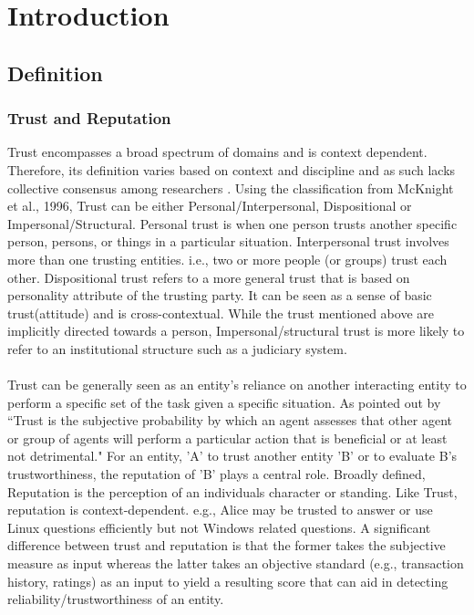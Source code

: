 \chapter{Introduction} \label{ch:intro}

\section{Definition}
\subsection{Trust and Reputation}
Trust encompasses a broad spectrum of domains and is context dependent.
Therefore, its definition varies based on context and discipline and as such
lacks collective consensus among researchers \cite{mcknight1996meanings} 
\cite{mcknight2001trust}.
Using the classification from McKnight et al., 1996, Trust can be either
Personal/Interpersonal, Dispositional or Impersonal/Structural.
Personal trust is when one person trusts another specific person, persons, or
things in a particular situation. Interpersonal trust involves more than one
trusting entities. i.e., two or more people (or groups) trust each other.
Dispositional trust refers to a more general trust that is based on personality
attribute of the trusting party. It can be seen as a sense of basic
trust(attitude) and is cross-contextual. While the trust mentioned above are
implicitly directed towards a person, Impersonal/structural trust is more
likely to refer to an institutional structure such as a judiciary system.\\\\ 
Trust can be generally seen as an entity's reliance on another interacting
entity to perform a specific set of the task given a specific situation.  As
pointed out by \cite{gambetta2000can} ``Trust is the subjective probability by
which an agent assesses that other agent or group of agents will perform a
particular action that is beneficial or at least not detrimental."
For an entity, 'A' to trust another entity 'B' or to evaluate B's
trustworthiness, the reputation of 'B' plays a central role. Broadly defined,
Reputation is the perception of an individuals character or standing. Like
Trust, reputation is context-dependent. e.g., Alice may be trusted to 
answer or use Linux questions efficiently but not Windows related questions.
\cite{zacharia2000collaborative}
A significant difference between trust and
reputation is that the former takes the subjective measure as input whereas the
latter takes an objective standard (e.g., transaction history, ratings) as an
input to yield a resulting score that can aid in detecting
reliability/trustworthiness of an entity. \cite{Sabater2005} \cite{castelfranchi2000trust} \\

